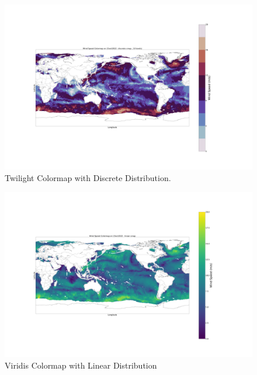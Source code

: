 \documentclass[conference]{IEEEtran}
\begin{document}
\begin{figure}
    \centering
    \includegraphics[scale=0.05]{images_deep/twilight_dis.png}
    \caption{Twilight Colormap with Discrete Distribution.}
    \label{colormap_1}
\end{figure}

\begin{figure}
    \centering
    \includegraphics[scale=0.05]{images_deep/viridis_lin.png}
    \caption{Viridis Colormap with Linear Distribution }
    \label{colormap_2}
\end{figure}
\end{document}
